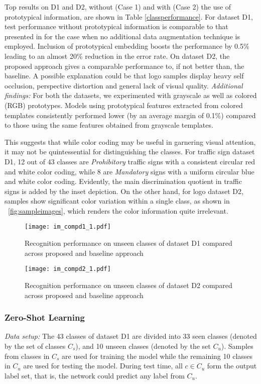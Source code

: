 \documentclass{bmvc2k}
\begin{document}
Top results on D1 and D2, without (Case 1) and with (Case 2) the use of
prototypical information, are shown in Table \ref{classperformance}. For dataset D1, test performance 
without prototypical information is comparable to that presented in
\cite{multicolumnarDNN} for the case when no additional data augmentation technique is employed. Inclusion
of prototypical embedding boosts the performance by 0.5\% leading
to an almost 20\% reduction in the error rate. On dataset D2, the proposed
approach gives a comparable performance to, if not better than, the
baseline.
A possible explanation could be that logo samples display heavy self
occlusion, perspective distortion and general lack of visual quality.
\iffalse
Our understanding is that a
deeper CNN with a greater adaptability to the above variations should give a
higher performance boost while attempting to match the samples to the
prototypes in the embedding space.
\fi\textit{Additional findings:} For both the datasets, we experimented with
grayscale as well as colored (RGB) prototypes. Models using prototypical features extracted from 
colored templates consistently performed lower (by an average margin of 0.1\%)
compared to those using the same features obtained from grayscale templates. 

This suggests that while color coding may be useful in
garnering visual attention, it may not be quintessential for distinguishing the
classes. For traffic sign dataset D1, 12 out of 43 classes
are \textit{Prohibitory} traffic signs with a consistent circular red and white
color coding, while 8 are \textit{Mandatory} signs with a uniform circular blue
and white color coding. Evidently, the main discrimination quotient in traffic signs is added by
the inset depiction. 
On the other hand, for logo dataset D2, samples show significant color
variation within a single class,  as shown in ~\ref{fig:sampleimages}, which
renders the color information quite irrelevant.
\begin{figure}
  \centering
  \texttt{[image: im\_compd1\_1.pdf]}
\caption{\label{fig:comparisonD1}Recognition performance on unseen classes of
dataset D1 compared across proposed and baseline \cite{norouzi2013zero} approach}
\end{figure}\begin{figure}
  \centering
  \texttt{[image: im\_compd2\_1.pdf]}
\caption{\label{fig:comparisonD2}Recognition performance on unseen classes of
dataset D2 compared across proposed and baseline \cite{norouzi2013zero}
approach}
\end{figure}\subsubsection{\label{}Zero-Shot Learning}\textit{Data setup:}  The 43 classes of dataset D1 are
divided into 33 seen classes (denoted by the set of classes $C_s$), and 10 unseen classes (denoted by the 
set $C_u$). Samples from classes in $C_s$ are used for 
training the model while the remaining 10 classes in $C_u$ are used for testing the model. During test time, all $c \in C_u$ form the output 
label set, that is, the network could predict any label from $C_u$.
\end{document}
